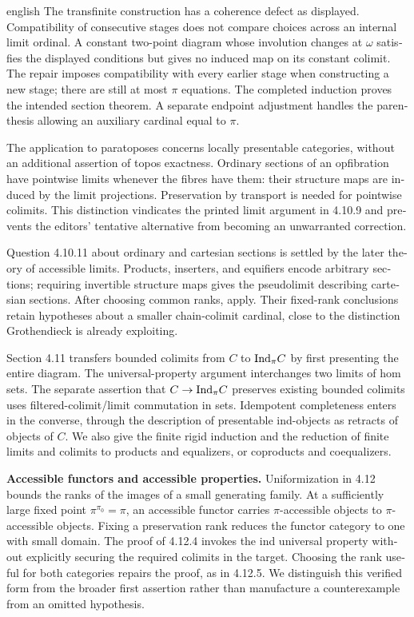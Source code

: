 \begin{otherlanguage}{english}
\begin{otherlanguage*}{english}
The transfinite construction has a coherence defect as displayed. Compatibility of consecutive stages does not compare choices across an internal limit ordinal. A constant two-point diagram whose involution changes at $\omega$ satisfies the displayed conditions but gives no induced map on its constant colimit. The repair imposes compatibility with every earlier stage when constructing a new stage; there are still at most $\pi$ equations. The completed induction proves the intended section theorem. A separate endpoint adjustment handles the parenthesis allowing an auxiliary cardinal equal to $\pi$.

The application to paratoposes concerns locally presentable categories, without an additional assertion of topos exactness. Ordinary sections of an opfibration have pointwise limits whenever the fibres have them: their structure maps are induced by the limit projections. Preservation by transport is needed for pointwise colimits. This distinction vindicates the printed limit argument in 4.10.9 and prevents the editors' tentative alternative from becoming an unwarranted correction.

Question 4.10.11 about ordinary and cartesian sections is settled by the later theory of accessible limits. Products, inserters, and equifiers encode arbitrary sections; requiring invertible structure maps gives the pseudolimit describing cartesian sections. After choosing common ranks, \citet[Theorems 8.1, 8.3 and Corollary 9.2]{Positselski2024Limits} apply. Their fixed-rank conclusions retain hypotheses about a smaller chain-colimit cardinal, close to the distinction Grothendieck is already exploiting.

Section 4.11 transfers bounded colimits from $C$ to $\mathrm{Ind}_\pi C$ by first presenting the entire diagram. The universal-property argument interchanges two limits of hom sets. The separate assertion that $C\to\mathrm{Ind}_\pi C$ preserves existing bounded colimits uses filtered-colimit/limit commutation in sets. Idempotent completeness enters in the converse, through the description of presentable ind-objects as retracts of objects of $C$. We also give the finite rigid induction and the reduction of finite limits and colimits to products and equalizers, or coproducts and coequalizers.

\medskip\noindent\textbf{Accessible functors and accessible properties.}
Uniformization in 4.12 bounds the ranks of the images of a small generating family. At a sufficiently large fixed point $\pi^{\pi_0}=\pi$, an accessible functor carries $\pi$-accessible objects to $\pi$-accessible objects. Fixing a preservation rank reduces the functor category to one with small domain. The proof of 4.12.4 invokes the ind universal property without explicitly securing the required colimits in the target. Choosing the rank useful for both categories repairs the proof, as in 4.12.5. We distinguish this verified form from the broader first assertion rather than manufacture a counterexample from an omitted hypothesis.


\end{otherlanguage*}
\end{otherlanguage}
